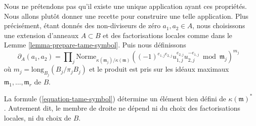 \medskip\noindent
Nous ne prétendons pas qu'il existe une unique application ayant ces propriétés.
Nous allons plutôt donner une recette pour construire une telle application.
Plus précisément, étant donnés des non-diviseurs de zéro $a_1, a_2 \in A$, nous choisissons
une extension d'anneaux $A \subset B$ et des factorisations locales
comme dans le Lemme \ref{lemma-prepare-tame-symbol}.
Puis nous définissons
\begin{equation}
\label{equation-tame-symbol}
\partial_A(a_1, a_2) = \prod\nolimits_j
\text{Norme}_{\kappa(\mathfrak m_j)/\kappa(\mathfrak m)}
((-1)^{e_{1, j}e_{2, j}}u_{1, j}^{e_{2, j}}u_{2, j}^{-e_{1, j}}
\bmod \mathfrak m_j)^{m_j}
\end{equation}
où $m_j = \text{long}_{B_j}(B_j/\pi_j B_j)$ et le produit
est pris sur les idéaux maximaux $\mathfrak m_1, \ldots, \mathfrak m_r$ de $B$.

\begin{lemma}
\label{lemma-well-defined-tame-symbol}
La formule (\ref{equation-tame-symbol}) détermine un
élément bien défini de $\kappa(\mathfrak m)^*$. Autrement dit, le
membre de droite ne dépend ni du choix des
factorisations locales, ni du choix de $B$.
\end{lemma}

